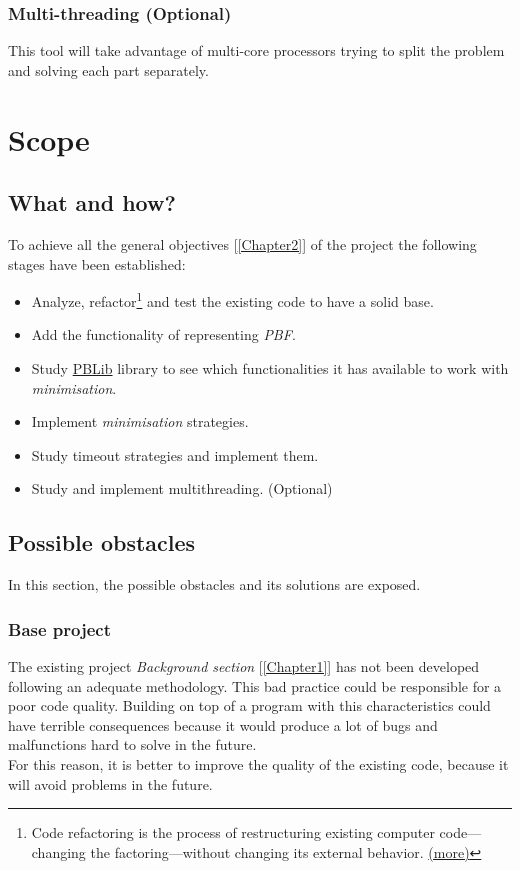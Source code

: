 \subsubsection{Multi-threading (Optional)}
This tool will take advantage of multi-core processors trying to split the problem and solving each part separately.

\section{Scope}
\subsection{What and how?}

To achieve all the general objectives [\ref{Chapter2}] of the project the following stages have been established:
\begin{itemize}
	\item Analyze, refactor\footnote{Code refactoring is the process of restructuring existing computer code—changing the factoring—without changing its external behavior. \href{https://en.wikipedia.org/wiki/Code_refactoring}{(more)}} and test the existing code to have a solid base. 
	\item Add the functionality of representing \emph{PBF}.
	\item Study \href{http://tools.computational-logic.org/content/pblib.php}{PBLib} library to see which functionalities it has available to work with \emph{minimisation}.
	\item Implement \emph{minimisation} strategies.
	\item Study timeout strategies and implement them.
	\item Study and implement multithreading. (Optional)
\end{itemize}

\subsection{Possible obstacles}

In this section, the possible obstacles and its solutions are exposed.

\subsubsection{Base project}
The existing project \emph{Background section} [\ref{Chapter1}] has not been developed following an adequate methodology. This bad practice could be responsible for a poor code quality. Building on top of a program with this characteristics could have terrible consequences because it would produce a lot of bugs and malfunctions hard to solve in the future. \\
For this reason, it is better to improve the quality of the existing code, because it will avoid problems in the future.

